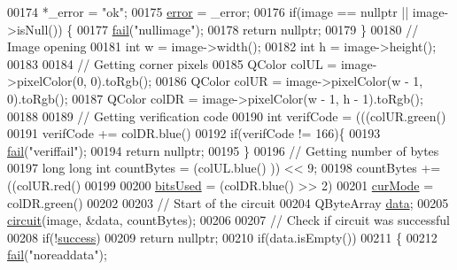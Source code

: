\begin{DoxyCode}
00174     *\_error = \textcolor{stringliteral}{"ok"};
00175     \hyperlink{class_model_p_c_a4e5a9c0ca1f06fe5bc478b6bf248c37c}{error} = \_error;
00176     \textcolor{keywordflow}{if}(image == \textcolor{keyword}{nullptr} || image->isNull()) \{
00177         \hyperlink{class_model_p_c_a47464b59b7e37fcee25e55475708aabd}{fail}(\textcolor{stringliteral}{"nullimage"});
00178         \textcolor{keywordflow}{return} \textcolor{keyword}{nullptr};
00179     \}
00180     \textcolor{comment}{// Image opening}
00181     \textcolor{keywordtype}{int} w = image->width();
00182     \textcolor{keywordtype}{int} h = image->height();
00183 
00184     \textcolor{comment}{// Getting corner pixels}
00185     QColor colUL = image->pixelColor(0, 0).toRgb();
00186     QColor colUR = image->pixelColor(w - 1, 0).toRgb();
00187     QColor colDR = image->pixelColor(w - 1, h - 1).toRgb();
00188 
00189     \textcolor{comment}{// Getting verification code}
00190     \textcolor{keywordtype}{int} verifCode = (((colUR.green() %
00191     verifCode += colDR.blue() %
00192     \textcolor{keywordflow}{if}(verifCode != 166)\{
00193         \hyperlink{class_model_p_c_a47464b59b7e37fcee25e55475708aabd}{fail}(\textcolor{stringliteral}{"veriffail"});
00194         \textcolor{keywordflow}{return} \textcolor{keyword}{nullptr};
00195     \}
00196     \textcolor{comment}{// Getting number of bytes}
00197     \textcolor{keywordtype}{long} \textcolor{keywordtype}{long} \textcolor{keywordtype}{int} countBytes = (colUL.blue() %
      )) << 9;
00198     countBytes += ((colUR.red() %
00199 
00200     \hyperlink{class_model_p_c_a655deb6a8afa94c7f4aadb3056989038}{bitsUsed} = (colDR.blue() >> 2) %
00201     \hyperlink{class_model_p_c_ad74974ac236182c1d6d2cf0729fac3dd}{curMode} = colDR.green() %
00202 
00203     \textcolor{comment}{// Start of the circuit}
00204     QByteArray \hyperlink{namespace_errors_dict_setup_adf4c30d205d29df7343e26f7c62b0685}{data};
00205     \hyperlink{class_model_p_c_a1d0091062a0c836b283ec2f67411623b}{circuit}(image, &data, countBytes);
00206 
00207     \textcolor{comment}{// Check if circuit was successful}
00208     \textcolor{keywordflow}{if}(!\hyperlink{class_model_p_c_a945ffbbc44a832b953c191debd448f4c}{success})
00209         \textcolor{keywordflow}{return} \textcolor{keyword}{nullptr};
00210     \textcolor{keywordflow}{if}(data.isEmpty())
00211     \{
00212         \hyperlink{class_model_p_c_a47464b59b7e37fcee25e55475708aabd}{fail}(\textcolor{stringliteral}{"noreaddata"});

\end{DoxyCode}
